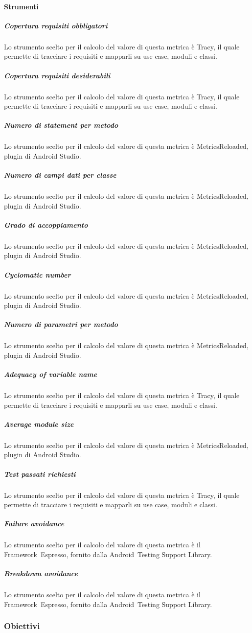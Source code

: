 \documentclass[../NormeProgetto.text]{subfiles}
\begin{document}
		\paragraph{Strumenti}
			\subparagraph{Copertura requisiti obbligatori}
				Lo strumento scelto per il calcolo del valore di questa metrica è Tracy\g, il quale permette di tracciare i requisiti e mapparli su use case, moduli e classi.
			\subparagraph{Copertura requisiti desiderabili}
				Lo strumento scelto per il calcolo del valore di questa metrica è Tracy\g, il quale permette di tracciare i requisiti e mapparli su use case, moduli e classi.
			\subparagraph{Numero di statement per metodo}
				Lo strumento scelto per il calcolo del valore di questa metrica è MetricsReloaded\g, plugin di Android Studio\g.
			\subparagraph{Numero di campi dati per classe}
				Lo strumento scelto per il calcolo del valore di questa metrica è MetricsReloaded\g, plugin di Android Studio\g.
			\subparagraph{Grado di accoppiamento}
				Lo strumento scelto per il calcolo del valore di questa metrica è MetricsReloaded\g, plugin di Android Studio\g.
			\subparagraph{Cyclomatic number}
				Lo strumento scelto per il calcolo del valore di questa metrica è MetricsReloaded\g, plugin di Android Studio\g.
			\subparagraph{Numero di parametri per metodo}
				Lo strumento scelto per il calcolo del valore di questa metrica è MetricsReloaded\g, plugin di Android Studio\g.
			\subparagraph{Adequacy of variable name}
				Lo strumento scelto per il calcolo del valore di questa metrica è Tracy\g, il quale permette di tracciare i requisiti e mapparli su use case, moduli e classi.
			\subparagraph{Average module size}
				Lo strumento scelto per il calcolo del valore di questa metrica è MetricsReloaded\g, plugin di Android Studio\g.
			\subparagraph{Test passati richiesti}
				Lo strumento scelto per il calcolo del valore di questa metrica è Tracy\g, il quale permette di tracciare i requisiti e mapparli su use case, moduli e classi.
			\subparagraph{Failure avoidance}
				Lo strumento scelto per il calcolo del valore di questa metrica è il Framework\g\ Espresso\g, fornito dalla Android\g\ Testing Support Library.
			\subparagraph{Breakdown avoidance}
				Lo strumento scelto per il calcolo del valore di questa metrica è il Framework\g\ Espresso\g, fornito dalla Android\g\ Testing Support Library.
							
	\subsubsection{Obiettivi}
\end{document}
